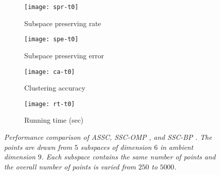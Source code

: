 \begin{figure*}[]
\begin{subfigure}[]{0.24\textwidth}
  \centering
    \texttt{[image: spr-t0]}\quad\caption{\footnotesize Subspace preserving rate}
    \end{subfigure}
    \begin{subfigure}[]{.24\textwidth}
  \centering
    \texttt{[image: spe-t0]}\quad\caption{\footnotesize  Subspace preserving error}
    \end{subfigure}
    \begin{subfigure}[]{.24\textwidth}
  \centering
    \texttt{[image: ca-t0]}\quad\caption{\footnotesize  Clustering accuracy}
\end{subfigure}
    \begin{subfigure}[]{.24\textwidth}
  \centering
    \texttt{[image: rt-t0]}\quad\caption{\footnotesize Running time (sec)}
\end{subfigure}
\caption{\it Performance comparison of ASSC, SSC-OMP \cite{dyer2013greedy,you2015sparse}, and SSC-BP \cite{elhamifar2009sparse,elhamifar2013sparse} {\color{black}{on synthetic data with no perturbation}}. The points are drawn from $5$ subspaces of dimension $6$ in ambient dimension $9$. Each subspace contains the same number of points and the overall number of points is varied from $250$ to $5000$.}
\vspace{-0.1cm}
\end{figure*}
